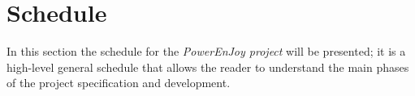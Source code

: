 \section{Schedule}\label{sec:schedule}
In this section the schedule for the \emph{PowerEnJoy project} will be presented; it is a high-level general schedule that allows the reader to understand the main phases of the project specification and development.
